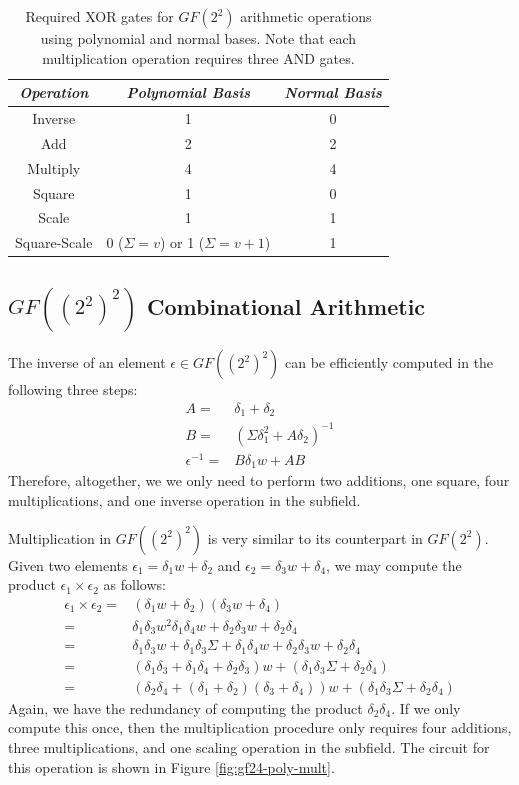 \begin{table}[ht!]
\begin{center}
\caption{Required XOR gates for $GF(2^2)$ arithmetic operations using polynomial and normal bases. Note that each multiplication operation requires three AND gates.}
	\begin{tabular}{| c | c | c |} \hline
	\emph{Operation} & \emph{Polynomial Basis} & \emph{Normal Basis} \\ \hline
	Inverse      & 1 & 0 \\
	Add          & 2 & 2 \\
	Multiply     & 4 & 4 \\
	Square       & 1 & 0 \\
	Scale        & 1 & 1 \\
	Square-Scale & 0 ($\Sigma = v$) or 1 ($\Sigma = v + 1$) & 1 \\ \hline
	\end{tabular}
\label{tab:gf22-ops-complexity}
\end{center}
\end{table}

\subsection{$GF((2^2)^2)$ Combinational Arithmetic}
The inverse of an element $\epsilon \in GF((2^2)^2)$ can be efficiently computed in the following three steps:
\begin{align*}
A = & \delta_1 + \delta_2 \\
B = & (\Sigma\delta_1^2 + A\delta_2)^{-1}\\
\epsilon^{-1} = & B\delta_1 w + AB 
\end{align*}
Therefore, altogether, we we only need to perform two additions, one square, four multiplications, and one inverse operation in the subfield. 

Multiplication in $GF((2^2)^2)$ is very similar to its counterpart in $GF(2^2)$. Given two elements $\epsilon_1 = \delta_1 w + \delta_2$ and $\epsilon_2 = \delta_3 w + \delta_4$, we may compute the product $\epsilon_1 \times \epsilon_2$ as follows:
\begin{align*}
\epsilon_1 \times \epsilon_2 = & (\delta_1 w + \delta_2)(\delta_3 w + \delta_4) \\
= & \delta_1\delta_3 w^2 \delta_1\delta_4 w + \delta_2\delta_3 w + \delta_2\delta_4 \\
= & \delta_1\delta_3 w + \delta_1\delta_3\Sigma + \delta_1\delta_4 w + \delta_2\delta_3 w + \delta_2\delta_4 \\
= & (\delta_1\delta_3 + \delta_1\delta_4 + \delta_2\delta_3)w + (\delta_1\delta_3\Sigma + \delta_2\delta_4) \\
= & (\delta_2\delta_4 + (\delta_1 + \delta_2)(\delta_3 + \delta_4)) w + (\delta_1\delta_3\Sigma + \delta_2\delta_4)
\end{align*}
Again, we have the redundancy of computing the product $\delta_2\delta_4$. If we only compute this once, then the multiplication procedure only requires four additions, three multiplications, and one scaling operation in the subfield. The circuit for this operation is shown in Figure \ref{fig:gf24-poly-mult}.

